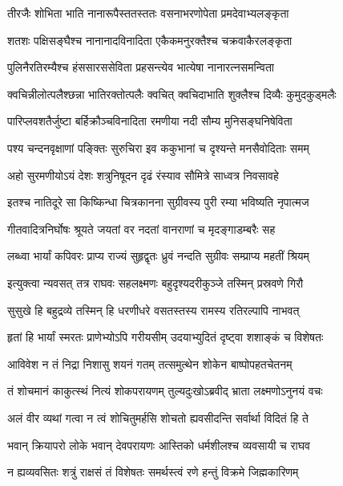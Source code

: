 \twolineshloka
{तीरजैः शोभिता भाति नानारूपैस्ततस्ततः}
{वसनाभरणोपेता प्रमदेवाभ्यलङ्कृता} %

\twolineshloka
{शतशः पक्षिसङ्घैश्च नानानादविनादिता}
{एकैकमनुरक्तैश्च चक्रवाकैरलङ्कृता} %

\twolineshloka
{पुलिनैरतिरम्यैश्च हंससारससेविता}
{प्रहसन्त्येव भात्येषा नानारत्नसमन्विता} %

\twolineshloka
{क्वचिन्नीलोत्पलैश्छन्ना भातिरक्तोत्पलैः क्वचित्}
{क्वचिदाभाति शुक्लैश्च दिव्यैः कुमुदकुड्मलैः} %

\twolineshloka
{पारिप्लवशतैर्जुष्टा बर्हिक्रौञ्चविनादिता}
{रमणीया नदी सौम्य मुनिसङ्घनिषेविता} %

\twolineshloka
{पश्य चन्दनवृक्षाणां पङ्क्तिः सुरुचिरा इव}
{ककुभानां च दृश्यन्ते मनसैवोदिताः समम्} %

\twolineshloka
{अहो सुरमणीयोऽयं देशः शत्रुनिषूदन}
{दृढं रंस्याव सौमित्रे साध्वत्र निवसावहे} %

\twolineshloka
{इतश्च नातिदूरे सा किष्किन्धा चित्रकानना}
{सुग्रीवस्य पुरी रम्या भविष्यति नृपात्मज} %

\twolineshloka
{गीतवादित्रनिर्घोषः श्रूयते जयतां वर}
{नदतां वानराणां च मृदङ्गाडम्बरैः सह} %

\twolineshloka
{लब्ध्वा भार्यां कपिवरः प्राप्य राज्यं सुहृद्वृतः}
{ध्रुवं नन्दति सुग्रीवः सम्प्राप्य महतीं श्रियम्} %

\twolineshloka
{इत्युक्त्वा न्यवसत् तत्र राघवः सहलक्ष्मणः}
{बहुदृश्यदरीकुञ्जे तस्मिन् प्रस्रवणे गिरौ} %

\twolineshloka
{सुसुखे हि बहुद्रव्ये तस्मिन् हि धरणीधरे}
{वसतस्तस्य रामस्य रतिरल्पापि नाभवत्} %

\twolineshloka
{हृतां हि भार्यां स्मरतः प्राणेभ्योऽपि गरीयसीम्}
{उदयाभ्युदितं दृष्ट्वा शशाङ्कं च विशेषतः} %

\twolineshloka
{आविवेश न तं निद्रा निशासु शयनं गतम्}
{तत्समुत्थेन शोकेन बाष्पोपहतचेतनम्} %

\twolineshloka
{तं शोचमानं काकुत्स्थं नित्यं शोकपरायणम्}
{तुल्यदुःखोऽब्रवीद् भ्राता लक्ष्मणोऽनुनयं वचः} %

\twolineshloka
{अलं वीर व्यथां गत्वा न त्वं शोचितुमर्हसि}
{शोचतो ह्यवसीदन्ति सर्वार्था विदितं हि ते} %

\twolineshloka
{भवान् क्रियापरो लोके भवान् देवपरायणः}
{आस्तिको धर्मशीलश्च व्यवसायी च राघव} %

\twolineshloka
{न ह्यव्यवसितः शत्रुं राक्षसं तं विशेषतः}
{समर्थस्त्वं रणे हन्तुं विक्रमे जिह्मकारिणम्} %

